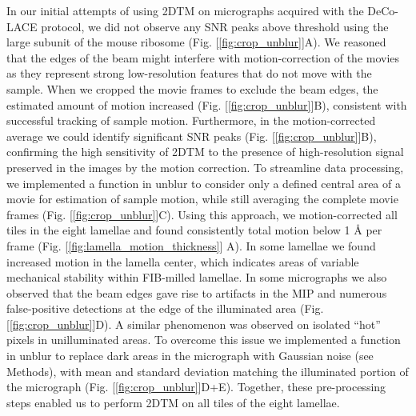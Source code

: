 \documentclass[
]{article}
\begin{document}
In our initial attempts of using 2DTM on micrographs acquired with the DeCo-LACE
protocol, we did not observe any SNR peaks above threshold using the large
subunit of the mouse ribosome (Fig. {[}\ref{fig:crop_unblur}{]}A). We reasoned that
the edges of the beam might interfere with motion-correction of the movies as
they represent strong low-resolution features that do not move with the sample.
When we cropped the movie frames to exclude the beam edges, the estimated amount
of motion increased (Fig. {[}\ref{fig:crop_unblur}{]}B), consistent with successful
tracking of sample motion. Furthermore, in the motion-corrected average we could
identify significant SNR peaks (Fig. {[}\ref{fig:crop_unblur}{]}B), confirming the
high sensitivity of 2DTM to the presence of high-resolution signal preserved in
the images by the motion correction. To streamline data processing, we
implemented a function in unblur to consider only a defined central area of a
movie for estimation of sample motion, while still averaging the complete movie
frames (Fig. {[}\ref{fig:crop_unblur}{]}C). Using this approach, we motion-corrected
all tiles in the eight lamellae and found consistently total motion below 1 Å
per frame (Fig. {[}\ref{fig:lamella_motion_thickness}{]} A). In some lamellae we
found increased motion in the lamella center, which indicates areas of variable
mechanical stability within FIB-milled lamellae. In some micrographs we also
observed that the beam edges gave rise to artifacts in the MIP and numerous
false-positive detections at the edge of the illuminated area (Fig. {[}\ref{fig:crop_unblur}{]}D). A
similar phenomenon was observed on isolated ``hot'' pixels in unilluminated areas.
To overcome this issue we implemented a function in unblur to replace
dark areas in the micrograph with Gaussian noise (see Methods), with
mean and standard deviation matching the illuminated portion of the micrograph
(Fig. {[}\ref{fig:crop_unblur}{]}D+E). Together, these pre-processing steps enabled us to perform 2DTM on
all tiles of the eight lamellae.
\end{document}
